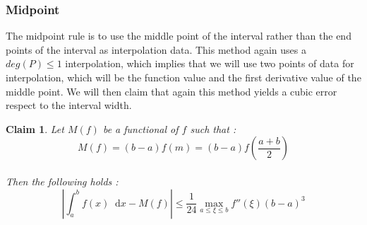 \documentclass[paper=a4, fontsize=11pt]{scrartcl}
\newcommand*\dif{\mathop{}\!\mathrm{d}}
\newtheorem{claim}{Claim}
\begin{document}
\vspace{0.15in}
\subsubsection{Midpoint}
\vspace{0.15in}

The midpoint rule is to use the middle point of the interval rather than the end points of the interval as interpolation data. This method again uses a $deg(P)\leq 1$ interpolation, which implies that we will use two points of data for interpolation, which will be the function value and the first derivative value of the middle point. We will then claim that again this method yields a cubic error respect to the interval width. \\

\begin{claim}
	Let $M(f)$ be a functional of $f$ such that : \\
	
	\begin{equation}\nonumber
		M(f) = (b-a) f(m) = (b-a) f(\frac{a+b}{2})
	\end{equation}\\
	
	Then the following holds : \\
	
	\begin{equation}\nonumber
		\left| \int_{a}^{b} f(x) \dif x - M(f) \right| \leq \frac{1}{24} \max_{a\leq\xi\leq b}f''(\xi) (b-a)^3
	\end{equation}\\
\end{claim}
\end{document}
